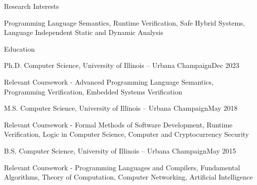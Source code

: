 \documentclass{resume} %
\begin{document}
 
\begin{rSection}{Research Interests}
\item Programming Language Semantics, Runtime Verification, Safe Hybrid Systems, Language Independent Static and Dynamic Analysis
\end{rSection}

\begin{rSection}{Education}
\begin{rSubsection}{Ph.D. Computer Science, University of Illinois -- Urbana Champaign}{Dec 2023}{}{}
\item Relevant Coursework - Advanced Programming Language Semantics, Programming Verification, Embedded Systems Verification
\end{rSubsection}
\begin{rSubsection}{M.S. Computer Science, University of Illinois -- Urbana Champaign}{May 2018}{}{}
\item Relevant Coursework - Formal Methods of Software Development, Runtime Verification, Logic in Computer Science, Computer and Cryptocurrency Security
\end{rSubsection}
\begin{rSubsection}{B.S. Computer Science, University of Illinois -- Urbana Champaign}{May 2015}{}{}
\item Relevant Coursework - Programming Languages and Compilers, Fundamental Algorithms, Theory of Computation, Computer Networking, Artificial Intelligence
\end{rSubsection}
\end{rSection}
\end{document}
